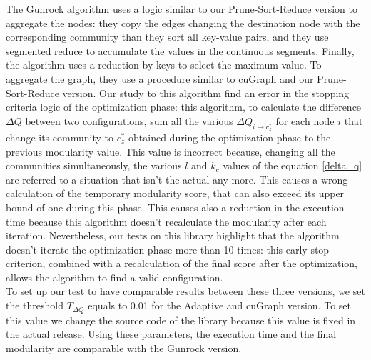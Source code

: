 The Gunrock algorithm uses a logic similar to our Prune-Sort-Reduce version to aggregate the nodes: they copy the edges changing the destination node with the corresponding community than they sort all key-value pairs, and they use segmented reduce to accumulate the values in the continuous segments. Finally, the algorithm uses a reduction by keys to select the maximum value. To aggregate the graph, they use a procedure similar to cuGraph and our Prune-Sort-Reduce version. Our study to this algorithm find an error in the stopping criteria logic of the optimization phase: this algorithm, to calculate the difference $\Delta Q$ between two configurations, sum all the various $\Delta Q_{i \rightarrow c_z^*}$ for each node $i$ that change its community to $c_z^*$ obtained during the optimization phase to the previous modularity value. This value is incorrect because, changing all the communities simultaneously, the various $l$ and $k_c$ values of the equation \ref{delta_q} are referred to a situation that isn't the actual any more. This causes a wrong calculation of the temporary modularity score, that can also exceed its upper bound of one during this phase. This causes also a reduction in the execution time because this algorithm doesn't recalculate the modularity after each iteration.
Nevertheless, our tests on this library highlight that the algorithm doesn't iterate the optimization phase more than 10 times: this early stop criterion, combined with a recalculation of the final score after the optimization, allows the algorithm to find a valid configuration.\\
To set up our test to have comparable results between these three versions, we set the threshold $T_{\Delta Q}$ equals to 0.01 for the Adaptive and cuGraph version. To set this value we change the source code of the library because this value is fixed in the actual release. Using these parameters, the execution time and the final modularity are comparable with the Gunrock version. 
